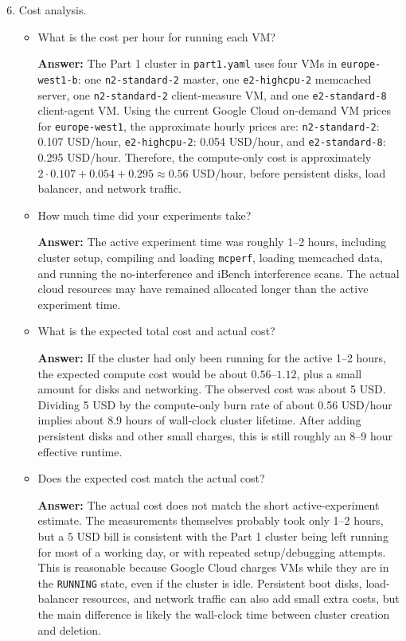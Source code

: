 \begin{enumerate}[label=(\alph*)]
    \setcounter{enumi}{5}
    \item Cost analysis.

    \begin{itemize}
        \item What is the cost per hour for running each VM?

        \textbf{Answer:} The Part 1 cluster in \texttt{part1.yaml} uses four VMs in \texttt{europe-west1-b}: one \texttt{n2-standard-2} master, one \texttt{e2-highcpu-2} memcached server, one \texttt{n2-standard-2} client-measure VM, and one \texttt{e2-standard-8} client-agent VM. Using the current Google Cloud on-demand VM prices for \texttt{europe-west1}, the approximate hourly prices are: \texttt{n2-standard-2}: 0.107 USD/hour, \texttt{e2-highcpu-2}: 0.054 USD/hour, and \texttt{e2-standard-8}: 0.295 USD/hour. Therefore, the compute-only cost is approximately
        $2 \cdot 0.107 + 0.054 + 0.295 \approx 0.56$ USD/hour, before persistent disks, load balancer, and network traffic.
        \\

        \item How much time did your experiments take?

        \textbf{Answer:} The active experiment time was roughly 1--2 hours, including cluster setup, compiling and loading \texttt{mcperf}, loading memcached data, and running the no-interference and iBench interference scans. The actual cloud resources may have remained allocated longer than the active experiment time.
        \\

        \item What is the expected total cost and actual cost?

        \textbf{Answer:} If the cluster had only been running for the active 1--2 hours, the expected compute cost would be about $0.56$--$1.12$, plus a small amount for disks and networking. The observed cost was about 5 USD. Dividing 5 USD by the compute-only burn rate of about 0.56 USD/hour implies about 8.9 hours of wall-clock cluster lifetime. After adding persistent disks and other small charges, this is still roughly an 8--9 hour effective runtime.
        \\

        \item Does the expected cost match the actual cost?

        \textbf{Answer:} The actual cost does not match the short active-experiment estimate. The measurements themselves probably took only 1--2 hours, but a 5 USD bill is consistent with the Part 1 cluster being left running for most of a working day, or with repeated setup/debugging attempts. This is reasonable because Google Cloud charges VMs while they are in the \texttt{RUNNING} state, even if the cluster is idle. Persistent boot disks, load-balancer resources, and network traffic can also add small extra costs, but the main difference is likely the wall-clock time between cluster creation and deletion.
    \end{itemize}
\end{enumerate}

\newpage
